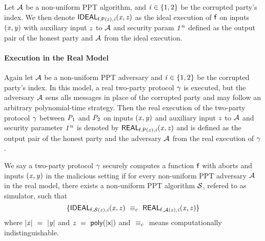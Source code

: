 Let $\mathcal{A}$ be a non-uniform PPT algorithm, and $\mathit{i} \in \{1,2\}$ be the corrupted party's index.
We then denote $\mathsf{IDEAL}_{\mathsf{f}, \mathsf{P}(\mathit{z}), \mathit{i}}(\mathit{x}, \mathit{z})$ as the ideal execution of $\mathsf{f}$ on inputs $(\mathit{x}, \mathit{y})$ with auxiliary input $\mathit{z}$ to $\mathcal{A}$ and security param $\mathit{1^n}$ defined as the output pair of the honest party and $\mathcal{A}$ from the ideal execution.

\paragraph{Execution in the Real Model} Again let $\mathcal{A}$ be a non-uniform PPT adversary and $\mathit{i} \in \{1,2\}$ be the corrupted party's index.
In this model, a real two-party protocol $\gamma$ is executed, but the adversary $\mathcal{A}$ sens alls messages in place of the corrupted party and may follow an arbitrary polynomial-time strategy.
Then the real execution of the two-party protocol $\gamma$ between $\mathit{P}_{1}$ and $\mathit{P}_{2}$ on inputs $(\mathit{x}, \mathit{y})$ and auxiliary input $\mathit{z}$ to $\mathcal{A}$ and security parameter $\mathit{1^n}$ is denoted by $\mathsf{REAL}_{\mathsf{f}, \mathsf{P}(\mathit{z}), \mathit{i}}(\mathit{x}, \mathit{z})$ and is defined as the output pair of the honest party and the adversary $\mathcal{A}$ from the real execution of $\gamma$.

\begin{definition}\label{subsec:pre:security}
    We say a two-party protocol $\gamma$ securely computes a function $\mathsf{f}$ with aborts and inputs $(\mathit{x}, \mathit{y})$ in the malicious setting if for every non-uniform PPT adversary $\mathcal{A}$ in the real model, there exists a non-uniform PPT algorithm $\mathcal{S}$, refered to as simulator, such that
    \[
        \{ \mathsf{IDEAL}_{\mathsf{f}, \mathcal{S}(\mathit{z}), \mathit{i}}(\mathit{x}, \mathit{z}) ~\equiv_{c}~ \mathsf{REAL}_{\mathsf{f}, \mathcal{A}(\mathit{z}), \mathit{i}}(\mathit{x}, \mathit{z}) \}
    \]
    where $|\mathit{x}| ~=~ |\mathit{y}|$ and $\mathit{z} ~=~ \mathsf{poly(|x|)}$ and $~\equiv_{c}~$ means computationally indistinguishable.
\end{definition}